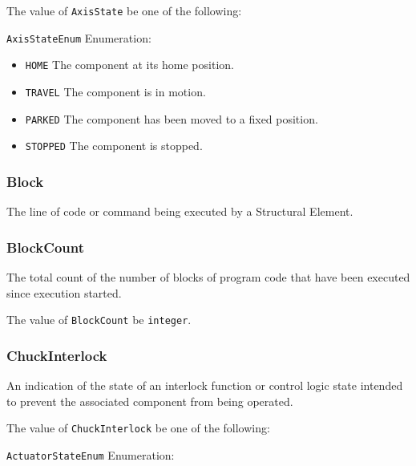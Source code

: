 The value of \texttt{AxisState} \MUST be one of the following: 


\texttt{AxisStateEnum} Enumeration:

\begin{itemize}
\item \texttt{HOME} \newline The component at its home position. 
\item \texttt{TRAVEL} \newline The component is in motion. 
\item \texttt{PARKED} \newline The component has been moved to a fixed position. 
\item \texttt{STOPPED} \newline The component is stopped. 
\end{itemize}



\subsubsection{Block}
\label{sec:Block}



The line of code or command being executed by a  \gls{Structural Element}.



\subsubsection{BlockCount}
\label{sec:BlockCount}



The total count of the number of blocks of program code that have been executed since execution started.


The value of \texttt{BlockCount} \MUST be \texttt{integer}.



\subsubsection{ChuckInterlock}




An indication of the state of an interlock function or control logic state intended to prevent the associated  component from being operated.


The value of \texttt{ChuckInterlock} \MUST be one of the following: 


\texttt{ActuatorStateEnum} Enumeration:

